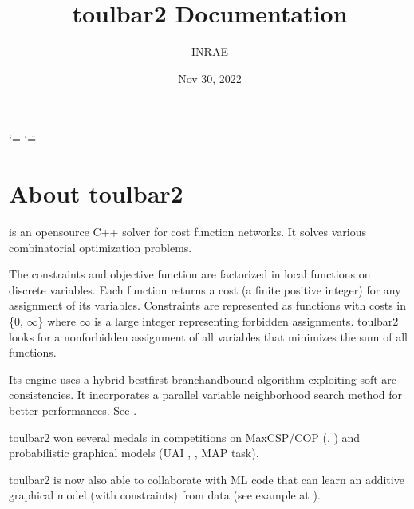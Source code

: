\documentclass[letterpaper,10pt,openany,oneside,english]{sphinxmanual}
\title{toulbar2 Documentation}
\date{Nov 30, 2022}
\author{INRAE}
\begin{document}
\ifdefined\shorthandoff
  \ifnum\catcode`\=\string=\active\shorthandoff{=}\fi
  \ifnum\catcode`\"=\active{}\fi
\fi

\pagestyle{empty}
\sphinxmaketitle
\pagestyle{plain}
\sphinxtableofcontents
\pagestyle{normal}
\label{\detokenize{index_pdf::doc}}
\sphinxstepscope
{}\label{\detokenize{presentation:presentation}}





\chapter{About toulbar2}
\label{\detokenize{presentation:about-toulbar2}}\label{\detokenize{presentation:id2}}
\sphinxAtStartPar
{} is an open\sphinxhyphen{}source C++ solver for cost function networks. It solves various combinatorial optimization problems.

\sphinxAtStartPar
The constraints and objective function are factorized in local functions on discrete variables. Each function returns a cost (a finite positive integer) for any assignment of its variables. Constraints are represented as functions with costs in \{0, \(\infty\)\} where \(\infty\) is a large integer representing forbidden assignments. toulbar2 looks for a non\sphinxhyphen{}forbidden assignment of all variables that minimizes the sum of all functions.

\sphinxAtStartPar
Its engine uses a hybrid best\sphinxhyphen{}first branch\sphinxhyphen{}and\sphinxhyphen{}bound algorithm exploiting soft arc consistencies. It incorporates a parallel variable neighborhood search method for better performances. See {\hyperref[\detokenize{publications:publications}]{}}.

\sphinxAtStartPar
toulbar2 won several medals in competitions on Max\sphinxhyphen{}CSP/COP (, ) and probabilistic graphical models (UAI , ,  MAP task).

\sphinxAtStartPar
toulbar2 is now also able to collaborate with ML code that can learn an additive graphical model (with constraints) from data (see example at ).
\end{document}
